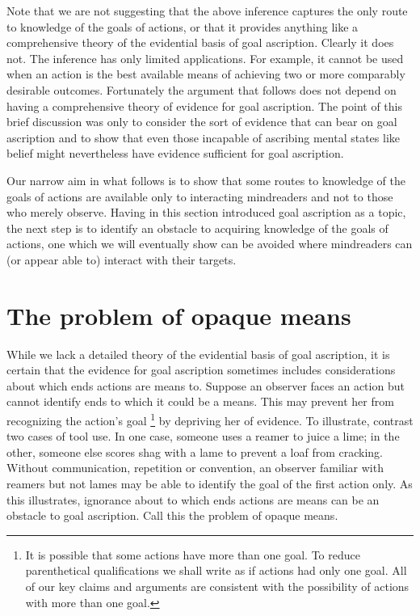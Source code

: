 \documentclass[12pt,\papersize]{extarticle}
\begin{document}
Note that we are not suggesting that the above inference captures the only route to knowledge of the goals of actions,
or that it provides anything like a comprehensive theory of the evidential basis of goal ascription.
Clearly it does not.
The inference has only limited applications.
For example, it cannot be used when an action is the best available means of achieving two or more comparably desirable outcomes. 
Fortunately the argument that follows does not depend on having a comprehensive theory of evidence for goal ascription.
The point of this brief discussion was only to 
consider the sort of evidence that can bear on goal ascription
and to 
show that 
even those incapable of ascribing mental states like belief 
might nevertheless have evidence sufficient for goal ascription.

Our narrow aim in what follows is to show that some routes to knowledge of the goals of actions 
are available only to interacting mindreaders
and not to those who merely observe.
Having in this section introduced goal ascription as a topic,
the next step is to identify an obstacle to acquiring knowledge of the goals of actions,
one which we will eventually show can be avoided where mindreaders can (or appear able to) interact with their targets.


\section{The problem of opaque means}
\label{sec:opaque_means}

While we lack a detailed theory of the evidential basis of goal ascription,
it is certain that the evidence for goal ascription sometimes includes considerations about which ends actions are means to.
Suppose an observer faces an action but cannot identify ends to which it could be a means.
This may prevent her from recognizing the action's goal%
\footnote{
It is possible that some actions have more than one goal.
To reduce parenthetical qualifications we shall write as if actions had only one goal.  
All of our key claims and arguments are consistent with the possibility of actions with more than one goal.
} 
 by depriving her of evidence.
To illustrate, contrast two cases of tool use.
In one case, someone uses a reamer to  juice  a lime; in the other, someone else scores shag with a lame to prevent a loaf from cracking.
Without communication, repetition or convention,
an observer familiar with reamers but not lames 
may be able to identify the goal of the first action only.
As this illustrates, ignorance about to which ends actions are means can be an obstacle to goal ascription.
Call this the problem of opaque means.
\end{document}
